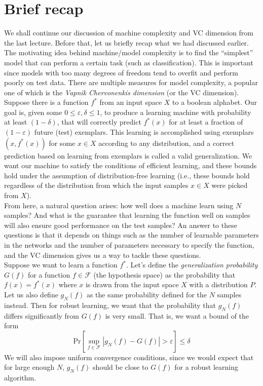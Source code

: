 \documentclass[11pt]{article}
\newcommand{\nl}{\vspace*{0.3cm}\\}
\begin{document}
\section{Brief recap}
We shall continue our discussion of machine complexity and VC dimension from the last lecture. Before that, let us briefly recap what we had discussed earlier.\nl
The motivating idea behind machine/model complexity is to find the ``simplest'' model that can perform a certain task (such as classification). This is important since models with too many degrees
of freedom tend to overfit and perform poorly on test data. There are multiple measures for model complexity, a popular one of which is the \emph{Vapnik Chervonenkis dimension} (or the VC
dimension).\nl
Suppose there is a function $f^*$ from an input space $X$ to a boolean alphabet. Our goal is, given some $0 \le \varepsilon, \delta \le 1$, to produce a learning machine with probability at least $(1
- \delta)$, that will correctly predict $f^*(x)$ for at least a fraction of $(1 - \varepsilon)$ future (test) exemplars. This learning is accomplished using exemplars $(x, f^*(x))$ for some $x
\in X$ according to any distribution, and a correct prediction based on learning from exemplars is called a valid generalization. We want our machine to satisfy the conditions of efficient
learning, and these bounds hold under the assumption of distribution-free learning (i.e., these bounds hold regardless of the distribution from which the input samples $x \in X$ were picked
from $X$).
\nl
From here, a natural question arises: how well does a machine learn using $N$ samples? And what is the guarantee that learning the function well on samples will also ensure good performance on
the test samples? An answer to these questions is that it depends on things such as the number of learnable parameters in the networks and the number of parameters necessary to specify the
function, and the VC dimension gives us a way to tackle these questions.\nl
Suppose we want to learn a function $f^*$. Let's define the \emph{generalization probability} $G(f)$ for a function $f \in \mathcal{F}$ (the hypothesis space) as the probability that $f(x) = f^*(x)$ where $x$ is drawn from the input space $X$ with a
distribution $P$. Let us also define $g_N(f)$ as the same probability defined for the $N$ samples instead. Then for robust learning, we want that the probability that $g_N(f)$ differs
significantly from $G(f)$ is very small. That is, we want a bound of the form \[\mathrm{Pr}[\sup_{f \in \mathcal{F}}|g_N(f) - G(f)| > \varepsilon] \le \delta\]
We will also impose uniform convergence conditions, since we would expect that for large enough $N$, $g_N(f)$ should be close to $G(f)$ for a robust learning algorithm.
\newpage
\end{document}
